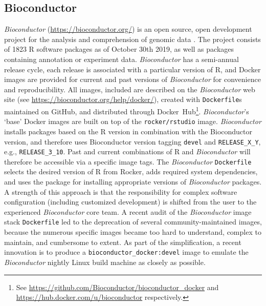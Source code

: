 \hypertarget{bioconductor}{%
\subsection{Bioconductor}\label{bioconductor}}

\label{bioc}

\emph{Bioconductor} (\url{https://bioconductor.org/}) is an open source,
open development project for the analysis and comprehension of genomic
data \citep{gentleman_bioconductor_2004}. The project consists of 1823 R
software packages as of October 30th 2019, as well as packages
containing annotation or experiment data. \emph{Bioconductor} has a
semi-annual release cycle, each release is associated with a particular
version of R, and Docker images are provided for current and past
versions of \emph{Bioconductor} for convenience and reproducibility. All
images, included are described on the \emph{Bioconductor} web site (see
\url{https://bioconductor.org/help/docker/}), created with
\texttt{Dockerfile}s maintained on GitHub, and distributed through
Docker~Hub\footnote{See \href{https://github.com/Bioconductor/bioconductor_docker}{https://github.com/Bioconductor/bioconductor\_docker} and \href{https://hub.docker.com/u/bioconductor}{https://hub.docker.com/u/bioconductor} respectively.}.
\emph{Bioconductor}'s `base' Docker images are built on top of the
\texttt{rocker/rstudio} image. \emph{Bioconductor} installs packages
based on the R version in combination with the Bioconductor version, and
therefore uses Bioconductor version tagging \texttt{devel} and
\texttt{RELEASE\_X\_Y}, e.g., \texttt{RELEASE\_3\_10}. Past and current
combinations of R and \emph{Bioconductor} will therefore be accessible
via a specific image tags. The \emph{Bioconductor} \texttt{Dockerfile}
selects the desired version of R from Rocker, adds required system
dependencies, and uses the  package for installing
appropriate versions of \emph{Bioconductor} packages. A strength of this
approach is that the responsibility for complex software configuration
(including customized development) is shifted from the user to the
experienced \emph{Bioconductor} core team. A recent audit of the
\emph{Bioconductor} image stack \texttt{Dockerfile} led to the
deprecation of several community-maintained images, because the numerous
specific images became too hard to understand, complex to maintain, and
cumbersome to extent. As part of the simplification, a recent innovation
is to produce a \texttt{bioconductor\_docker:devel} image to emulate the
\emph{Bioconductor} nightly Linux build machine as closely as possible.
